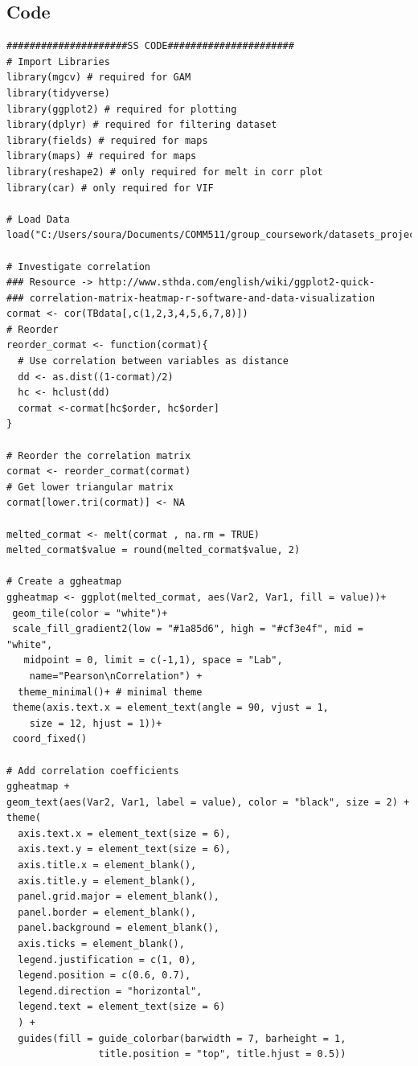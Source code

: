 \documentclass{article}
\begin{document}
\subsection{Code}
\begin{verbatim}
#####################SS CODE######################
# Import Libraries
library(mgcv) # required for GAM 
library(tidyverse) 
library(ggplot2) # required for plotting
library(dplyr) # required for filtering dataset
library(fields) # required for maps
library(maps) # required for maps
library(reshape2) # only required for melt in corr plot
library(car) # only required for VIF

# Load Data
load("C:/Users/soura/Documents/COMM511/group_coursework/datasets_project.RData")

# Investigate correlation
### Resource -> http://www.sthda.com/english/wiki/ggplot2-quick-
### correlation-matrix-heatmap-r-software-and-data-visualization
cormat <- cor(TBdata[,c(1,2,3,4,5,6,7,8)])
# Reorder
reorder_cormat <- function(cormat){
  # Use correlation between variables as distance
  dd <- as.dist((1-cormat)/2)
  hc <- hclust(dd)
  cormat <-cormat[hc$order, hc$order]
}

# Reorder the correlation matrix
cormat <- reorder_cormat(cormat)
# Get lower triangular matrix
cormat[lower.tri(cormat)] <- NA

melted_cormat <- melt(cormat , na.rm = TRUE)
melted_cormat$value = round(melted_cormat$value, 2)

# Create a ggheatmap
ggheatmap <- ggplot(melted_cormat, aes(Var2, Var1, fill = value))+
 geom_tile(color = "white")+
 scale_fill_gradient2(low = "#1a85d6", high = "#cf3e4f", mid = "white", 
   midpoint = 0, limit = c(-1,1), space = "Lab", 
    name="Pearson\nCorrelation") +
  theme_minimal()+ # minimal theme
 theme(axis.text.x = element_text(angle = 90, vjust = 1, 
    size = 12, hjust = 1))+
 coord_fixed()

# Add correlation coefficients
ggheatmap +
geom_text(aes(Var2, Var1, label = value), color = "black", size = 2) +
theme(
  axis.text.x = element_text(size = 6),
  axis.text.y = element_text(size = 6),
  axis.title.x = element_blank(),
  axis.title.y = element_blank(),
  panel.grid.major = element_blank(),
  panel.border = element_blank(),
  panel.background = element_blank(),
  axis.ticks = element_blank(),
  legend.justification = c(1, 0),
  legend.position = c(0.6, 0.7),
  legend.direction = "horizontal",
  legend.text = element_text(size = 6)
  ) + 
  guides(fill = guide_colorbar(barwidth = 7, barheight = 1,
                title.position = "top", title.hjust = 0.5))


\end{verbatim}
\end{document}
